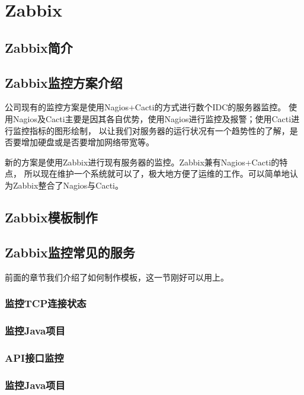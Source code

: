 \chapter{Zabbix}

\section{Zabbix简介}

\section{Zabbix监控方案介绍}

公司现有的监控方案是使用Nagios+Cacti的方式进行数个IDC的服务器监控。
使用Nagios及Cacti主要是因其各自优势，使用Nagios进行监控及报警；使用Cacti进行监控指标的图形绘制，
以让我们对服务器的运行状况有一个趋势性的了解，是否要增加硬盘或是否要增加网络带宽等。

新的方案是使用Zabbix进行现有服务器的监控。Zabbix兼有Nagios+Cacti的特点，
所以现在维护一个系统就可以了，极大地方便了运维的工作。可以简单地认为Zabbix整合了Nagios与Cacti。

\section{Zabbix模板制作}

\section{Zabbix监控常见的服务}

前面的章节我们介绍了如何制作模板，这一节刚好可以用上。

\subsection{监控TCP连接状态}

\subsection{监控Java项目}

\subsection{API接口监控}

\subsection{监控Java项目}